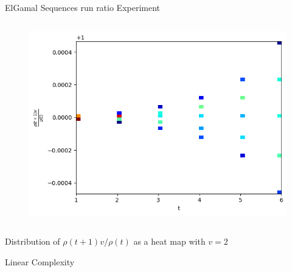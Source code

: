 \begin{frame}{ElGamal Sequences run ratio Experiment}
\begin{columns}
\begin{column}{0.45\textwidth}
\begin{figure}
                \includegraphics[width=\textwidth]{figures/v2AndvisGenNormalizedrunratio.png}
            \end{figure}
        \end{column}
    \end{columns}
    \begin{center}
                Distribution of $\rho(t+1)v/\rho(t)$ as a heat map with $v = 2$
    \end{center}
\end{frame}

\begin{frame}{Linear Complexity}
  \end{frame}


